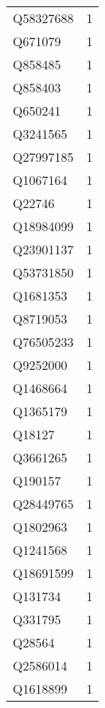 \begin{tabular}{lr}
   Q58327688 &                             1 \\
     Q671079 &                             1 \\
     Q858485 &                             1 \\
     Q858403 &                             1 \\
     Q650241 &                             1 \\
    Q3241565 &                             1 \\
   Q27997185 &                             1 \\
    Q1067164 &                             1 \\
      Q22746 &                             1 \\
   Q18984099 &                             1 \\
   Q23901137 &                             1 \\
   Q53731850 &                             1 \\
    Q1681353 &                             1 \\
    Q8719053 &                             1 \\
   Q76505233 &                             1 \\
    Q9252000 &                             1 \\
    Q1468664 &                             1 \\
    Q1365179 &                             1 \\
      Q18127 &                             1 \\
    Q3661265 &                             1 \\
     Q190157 &                             1 \\
   Q28449765 &                             1 \\
    Q1802963 &                             1 \\
    Q1241568 &                             1 \\
   Q18691599 &                             1 \\
     Q131734 &                             1 \\
     Q331795 &                             1 \\
      Q28564 &                             1 \\
    Q2586014 &                             1 \\
    Q1618899 &                             1 \\

\end{tabular}
